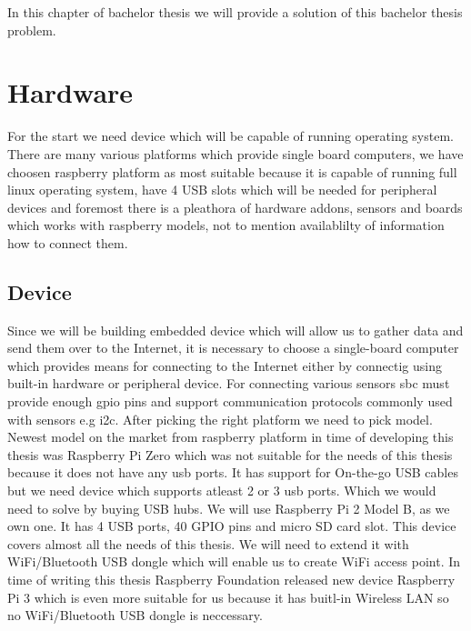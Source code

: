 In this chapter of bachelor thesis we will provide a solution of this bachelor thesis problem.
\section{Hardware}
For the start we need device which will be capable of running operating system. There are many various platforms which provide single board computers, we have choosen raspberry platform as most suitable because it is capable of running full linux operating system, have 4 USB slots which will be needed for peripheral devices and foremost there is a pleathora of hardware addons, sensors and boards which works with raspberry models, not to mention availablilty of information how to connect them.
\subsection{Device}
Since we will be building embedded device which will allow us to gather data and send them over to the Internet, it is necessary to choose a single-board computer which provides means for connecting to the Internet either by connectig using built-in hardware or peripheral device. For connecting various sensors \gls{sbc} must provide enough \gls{gpio} pins and support communication protocols commonly used with sensors e.g \gls{i2c}.
After picking the right platform we need to pick model. Newest model on the market from raspberry platform in time of developing this thesis was Raspberry Pi Zero which was not suitable for the needs of this thesis because it does not have any usb ports. It has support for On-the-go USB cables but we need device which supports atleast 2 or 3 usb ports. Which we would need to solve by buying USB hubs. We will use Raspberry Pi 2 Model B, as we own one. It has 4 USB ports, 40 GPIO pins and micro SD card slot. This device covers almost all the needs of this thesis. We will need to extend it with WiFi/Bluetooth USB dongle which will enable us to create WiFi access point. In time of writing this thesis Raspberry Foundation released new device Raspberry Pi 3 which is even more suitable for us because it has buitl-in Wireless LAN so no WiFi/Bluetooth USB dongle is neccessary.
